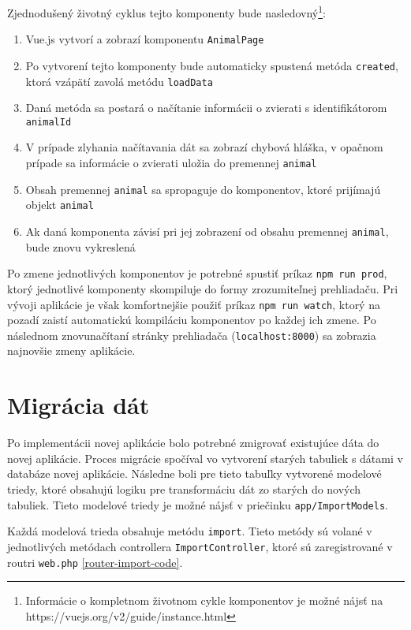 Zjednodušený životný cyklus tejto komponenty bude nasledovný\footnote{Informácie o kompletnom životnom cykle komponentov je možné nájsť na https://vuejs.org/v2/guide/instance.html}:
\begin{enumerate}
	\item Vue.js vytvorí a zobrazí komponentu \texttt{AnimalPage}
	\item Po vytvorení tejto komponenty bude automaticky spustená metóda \texttt{created}, ktorá vzápätí zavolá metódu \texttt{loadData}
	\item Daná metóda sa postará o načítanie informácii o zvierati s identifikátorom \texttt{animalId}
	\item V prípade zlyhania načítavania dát sa zobrazí chybová hláška, v opačnom prípade sa informácie o zvierati uložia do premennej \texttt{animal}
	\item Obsah premennej \texttt{animal} sa spropaguje do komponentov, ktoré prijímajú objekt \texttt{animal}
	\item Ak daná komponenta závisí pri jej zobrazení od obsahu premennej \texttt{animal}, bude znovu vykreslená
\end{enumerate}

Po zmene jednotlivých komponentov je potrebné spustiť príkaz \texttt{npm run prod}, ktorý jednotlivé komponenty skompiluje do formy zrozumiteľnej prehliadaču. Pri vývoji aplikácie je však komfortnejšie použiť príkaz \texttt{npm run watch}, ktorý na pozadí zaistí automatickú kompiláciu komponentov po každej ich zmene. Po následnom znovunačítaní stránky prehliadača (\texttt{localhost:8000}) sa zobrazia najnovšie zmeny aplikácie.

\section{Migrácia dát}
Po implementácii novej aplikácie bolo potrebné zmigrovať existujúce dáta do novej aplikácie. Proces migrácie spočíval vo vytvorení starých tabuliek s dátami v databáze novej aplikácie. Následne boli pre tieto tabuľky vytvorené modelové triedy, ktoré obsahujú logiku pre transformáciu dát zo starých do nových tabuliek. Tieto modelové triedy je možné nájsť v priečinku \texttt{app/ImportModels}.

Každá modelová trieda obsahuje metódu \texttt{import}. Tieto metódy sú volané v jednotlivých metódach controllera \texttt{ImportController}, ktoré sú zaregistrované v routri \texttt{web.php} \ref{router-import-code}.

